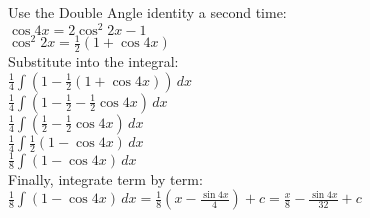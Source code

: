 \documentclass[../main.tex]{subfiles}
\begin{document}
\begin{enumerate}[itemsep=1cm]
    Use the Double Angle identity a second time:\\
    \(\cos{4x}=2\cos^2{2x}-1\)\\
    \(\cos^2{2x}=\frac{1}{2}(1+\cos{4x})\)\\

    Substitute into the integral:\\
    \(\frac{1}{4}\int (1-\frac{1}{2}(1+\cos{4x}))\,dx\)\\
    \(\frac{1}{4}\int (1-\frac{1}{2}-\frac{1}{2}\cos{4x})\,dx\)\\
    \(\frac{1}{4}\int (\frac{1}{2}-\frac{1}{2}\cos{4x})\,dx\)\\
    \(\frac{1}{4}\int \frac{1}{2}(1-\cos{4x})\,dx\)\\
    \(\frac{1}{8}\int (1-\cos{4x})\,dx\)\\

    Finally, integrate term by term:\\
    \(\frac{1}{8}\int (1-\cos{4x})\,dx=\frac{1}{8}(x-\frac{\sin{4x}}{4})+c=\frac{x}{8}-\frac{\sin{4x}}{32}+c\)\\
    
    \end{enumerate}
\end{document}
